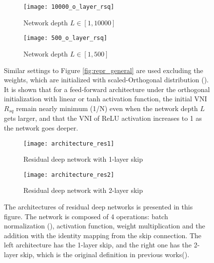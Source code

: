\begin{figure}[h]
    \centering
    \newcommand{\myWidth}{0.9\textwidth}
    \begin{subfigure}{\myWidth}
      \centering
      \caption{Network depth $L\in[1, 10000]$}
      \texttt{[image: 10000\_o\_layer\_rsq]}
      \label{fig:repr_orthogonal_a}
    \end{subfigure}
    
    \begin{subfigure}{\myWidth}
      \centering
      \caption{Network depth $L\in[1, 500]$}
      \texttt{[image: 500\_o\_layer\_rsq]}
      \label{fig:repr_orthogonal_b}
    \end{subfigure}%
    \caption[The initial VNI $R_{sq}$ of orthogonal initialized networks.]{
        Similar settings to Figure \ref{fig:repr_general} are used excluding the weights,
        which are initialized with scaled-Orthogonal distribution (\cite{mft:linear}).
        It is shown that for a feed-forward architecture under the orthogonal initialization
        with linear or tanh activation function, the initial VNI $R_{sq}$ remain nearly
        minimum (1/N) even when the network depth $L$ gets larger, and that the VNI of ReLU
        activation increases to 1 as the network goes deeper.
    }
    \label{fig:repr_orthogonal}
\end{figure}

\begin{figure}[h]
    \centering
    \newcommand{\myWidth}{0.48\textwidth}
    \begin{subfigure}{\myWidth}
      \centering
      \caption{Residual deep network with 1-layer skip}
      \texttt{[image: architecture\_res1]}
      \label{fig:resnet_def1}
    \end{subfigure}
    \begin{subfigure}{\myWidth}
      \centering
      \caption{Residual deep network with 2-layer skip}
      \texttt{[image: architecture\_res2]}
      \label{fig:resnet_def2}
    \end{subfigure}%
    \caption[The architectures of residual deep networks]{
        The architectures of residual deep networks is presented in this figure.
        The network is composed of 4 operations: batch normalization (\cite{batchnorm}), activation
        function, weight multiplication and the addition with the identity mapping from the skip 
        connection.
        The left architecture has the 1-layer skip, and the right one has the 2-layer skip, which is
        the original definition in previous works(\cite{resnet2}).
    }
    \label{fig:resnet_def}
\end{figure}

